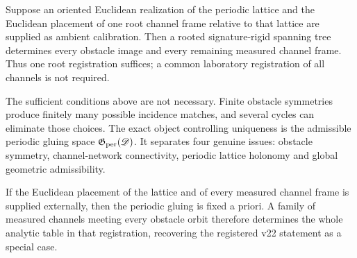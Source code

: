 \begin{corollary}
\label{cor:v23-known-lattice-frame}
Suppose an oriented Euclidean realization of the periodic lattice and the
Euclidean placement of one root channel frame relative to that lattice are
supplied as ambient calibration.  Then a rooted signature-rigid spanning tree
determines every obstacle image and every remaining measured channel frame.
Thus one root registration suffices; a common laboratory registration of all
channels is not required.
\end{corollary}

\begin{remark}
\label{rem:v23-generic-holonomy}
The sufficient conditions above are not necessary.  Finite obstacle symmetries
produce finitely many possible incidence matches, and several cycles can
eliminate those choices.  The exact object controlling uniqueness is the
admissible periodic gluing space \(\mathfrak G_{\rm per}(\mathscr D)\).  It
separates four genuine issues: obstacle symmetry, channel-network connectivity,
periodic lattice holonomy and global geometric admissibility.
\end{remark}

\begin{corollary}
\label{cor:v23-registered-special-case}
If the Euclidean placement of the lattice and of every measured channel frame
is supplied externally, then the periodic gluing is fixed a priori.  A family
of measured channels meeting every obstacle orbit therefore determines the
whole analytic table in that registration, recovering the registered v22
statement as a special case.
\end{corollary}
